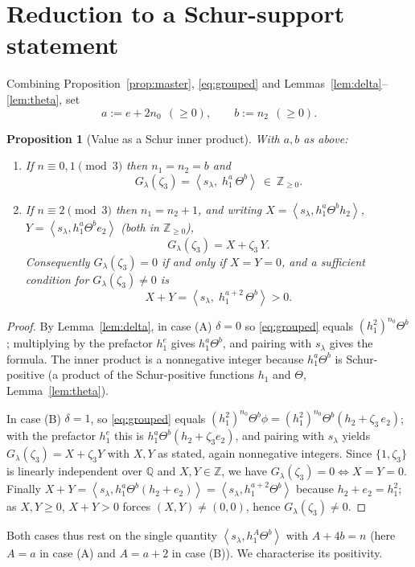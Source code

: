 \documentclass[11pt]{article}
\newtheorem{proposition}{Proposition}
\theoremstyle{definition}
\theoremstyle{remark}
\newcommand{\ZZ}{\mathbb{Z}}
\newcommand{\QQ}{\mathbb{Q}}
\newcommand{\la}{\lambda}
\newcommand{\inner}[1]{\left\langle #1 \right\rangle}
\newcommand{\zt}{\zeta_3}
\begin{document}
\section{Reduction to a Schur-support statement}

Combining Proposition~\ref{prop:master}, \eqref{eq:grouped} and
Lemmas~\ref{lem:delta}--\ref{lem:theta}, set
\[
  a:=e+2n_0\ \ (\ge0),\qquad b:=n_2\ \ (\ge0).
\]

\begin{proposition}[Value as a Schur inner product]\label{prop:reform}
With $a,b$ as above:
\begin{enumerate}
\item[\rm(A)] If $n\equiv0,1\pmod3$ then $n_1=n_2=b$ and
  \[
    G_\la(\zt)=\inner{s_\la,\;h_1^{a}\,\Theta^{b}}\ \in\ \ZZ_{\ge0}.
  \]
\item[\rm(B)] If $n\equiv2\pmod3$ then $n_1=n_2+1$, and writing
  $X=\inner{s_\la,h_1^{a}\Theta^{b}h_2}$, $Y=\inner{s_\la,h_1^{a}\Theta^{b}e_2}$ (both in
  $\ZZ_{\ge0}$),
  \[
    G_\la(\zt)=X+\zt\,Y .
  \]
  Consequently $G_\la(\zt)=0$ if and only if $X=Y=0$, and a sufficient condition for
  $G_\la(\zt)\neq0$ is
  \[
    X+Y=\inner{s_\la,\;h_1^{a+2}\,\Theta^{b}}>0 .
  \]
\end{enumerate}
\end{proposition}

\begin{proof}
By Lemma~\ref{lem:delta}, in case (A) $\delta=0$ so \eqref{eq:grouped} equals
$(h_1^2)^{n_0}\Theta^{b}$; multiplying by the prefactor $h_1^{e}$ gives
$h_1^{a}\Theta^{b}$, and pairing with $s_\la$ gives the formula. The inner product is a
nonnegative integer because $h_1^{a}\Theta^{b}$ is Schur-positive (a product of the
Schur-positive functions $h_1$ and $\Theta$, Lemma~\ref{lem:theta}).

In case (B) $\delta=1$, so \eqref{eq:grouped} equals
$(h_1^2)^{n_0}\Theta^{b}\phi=(h_1^2)^{n_0}\Theta^{b}(h_2+\zt\,e_2)$; with the prefactor
$h_1^{e}$ this is $h_1^{a}\Theta^{b}(h_2+\zt e_2)$, and pairing with $s_\la$ yields
$G_\la(\zt)=X+\zt Y$ with $X,Y$ as stated, again nonnegative integers. Since
$\{1,\zt\}$ is linearly independent over $\QQ$ and $X,Y\in\ZZ$, we have $G_\la(\zt)=0
\iff X=Y=0$. Finally $X+Y=\inner{s_\la,h_1^{a}\Theta^{b}(h_2+e_2)}
=\inner{s_\la,h_1^{a+2}\Theta^{b}}$ because $h_2+e_2=h_1^2$; as $X,Y\ge0$, $X+Y>0$
forces $(X,Y)\neq(0,0)$, hence $G_\la(\zt)\neq0$.
\end{proof}

Both cases thus rest on the single quantity $\inner{s_\la,h_1^{A}\Theta^{b}}$ with
$A+4b=n$ (here $A=a$ in case (A) and $A=a+2$ in case (B)). We characterise its
positivity.
\end{document}
